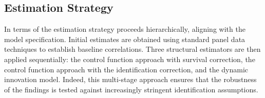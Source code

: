 \documentclass[a4paper, 12pt]{article}
\begin{document}
\subsection{Estimation Strategy}

In terms of the estimation strategy proceeds hierarchically, aligning with the model specification. Initial estimates are obtained using standard panel data techniques to establish baseline correlations. Three structural estimators are then applied sequentially: the \textcite{olley1992dynamics} control function approach with survival correction, the \textcite{levinsohn2003estimating} control function approach with the \textcite{ackerberg2015identification} identification correction, and the \textcite{doraszelski2013r} dynamic innovation model. Indeed, this multi-stage approach ensures that the robustness of the findings is tested against increasingly stringent identification assumptions.
\end{document}
